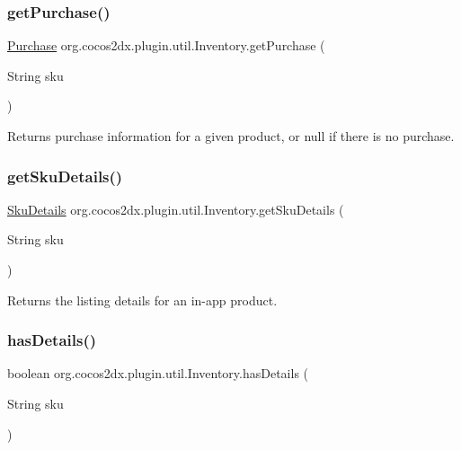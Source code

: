 \subsubsection{\texorpdfstring{get\+Purchase()}{getPurchase()}}
{\footnotesize\ttfamily \hyperlink{classorg_1_1cocos2dx_1_1plugin_1_1util_1_1Purchase}{Purchase} org.\+cocos2dx.\+plugin.\+util.\+Inventory.\+get\+Purchase (\begin{DoxyParamCaption}\item[{String}]{sku }\end{DoxyParamCaption})\hspace{0.3cm}{\ttfamily [inline]}}

Returns purchase information for a given product, or null if there is no purchase. \mbox{\label{classorg_1_1cocos2dx_1_1plugin_1_1util_1_1Inventory_ac70d891f17efa646a9d72f1d05b65d6e}} 
\subsubsection{\texorpdfstring{get\+Sku\+Details()}{getSkuDetails()}}
{\footnotesize\ttfamily \hyperlink{classorg_1_1cocos2dx_1_1plugin_1_1util_1_1SkuDetails}{Sku\+Details} org.\+cocos2dx.\+plugin.\+util.\+Inventory.\+get\+Sku\+Details (\begin{DoxyParamCaption}\item[{String}]{sku }\end{DoxyParamCaption})\hspace{0.3cm}{\ttfamily [inline]}}

Returns the listing details for an in-\/app product. \mbox{\label{classorg_1_1cocos2dx_1_1plugin_1_1util_1_1Inventory_a5a47dba6ae3d3d90d558e200be08cb58}} 
\subsubsection{\texorpdfstring{has\+Details()}{hasDetails()}}
{\footnotesize\ttfamily boolean org.\+cocos2dx.\+plugin.\+util.\+Inventory.\+has\+Details (\begin{DoxyParamCaption}\item[{String}]{sku }\end{DoxyParamCaption})\hspace{0.3cm}{\ttfamily [inline]}}

